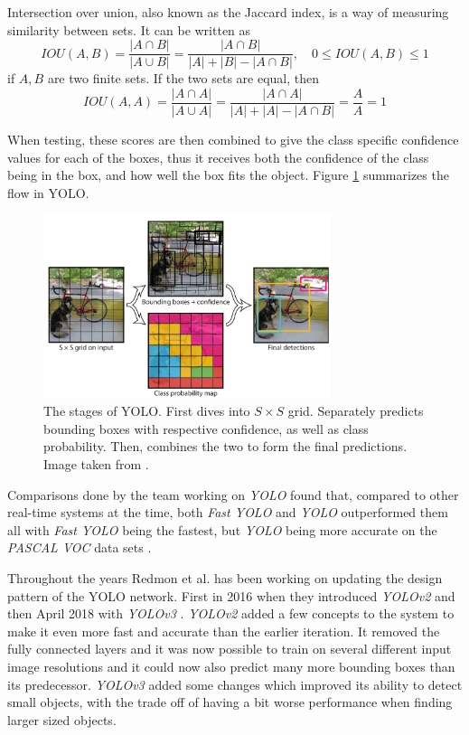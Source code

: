  Intersection over union, also known as the Jaccard index, is a way of measuring similarity between sets. It can be written as 
 \[
IOU(A,B) =  \frac{|A\cap B |}{|A\cup B|} =\frac{|A\cap B|}{|A| + |B| - |A \cap B|}
, \quad 0\leq IOU(A,B) \leq 1
 \]
 if $A,B$ are two finite sets. If the two sets are equal, then \[ IOU(A,A) =  \frac{|A\cap A |}{|A\cup A|} = \frac{|A\cap A|}{|A| + |A| - |A \cap B|}  = \frac{A}{A} = 1 \]
 
 When testing, these scores are then combined to give the class specific confidence values for each of the boxes, thus it receives both the confidence of the class being in the box, and how well the box fits the object. Figure \ref{fig:YOLO_stages} summarizes the flow in YOLO. 
\begin{figure}[hbtp]
\begin{center}
\includegraphics[width = 0.75\textwidth]{./Images/YOLO_stages.PNG} 
\caption{The stages of YOLO. First dives into $S \times S$ grid. Separately predicts bounding boxes with respective confidence, as well as class probability. Then, combines the two to form the final predictions. Image taken from \cite{YOLO1}.}
\label{fig:YOLO_stages}
\end{center}
\end{figure}

Comparisons done by the team working on \textit{YOLO} found that, compared to other real-time systems at the time, both \textit{Fast YOLO} and \textit{YOLO} outperformed them all with \textit{Fast YOLO} being the fastest, but \textit{YOLO} being more accurate on the \textit{PASCAL VOC} data sets \cite{PASCAL}.

Throughout the years Redmon et al. has been working on updating the design pattern of the 
YOLO network. First in 2016 when they introduced \textit{YOLOv2} and then April 2018 with \textit{YOLOv3} \cite{YOLO2}\cite{YOLO3}. \textit{YOLOv2} added a few concepts to the system to make it even more fast and accurate than the earlier iteration. It removed the fully connected layers and it was now possible to train on several different input image resolutions and it could now also predict many more bounding boxes than its predecessor. \textit{YOLOv3} added some changes which improved its ability to detect small objects, with the trade off of having a bit worse performance when finding larger sized objects.  

